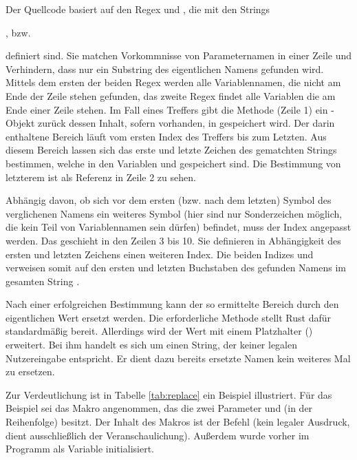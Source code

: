 Der Quellcode basiert auf den Regex  und , die mit den Strings 

, bzw. 

 definiert sind. Sie matchen Vorkommnisse von Parameternamen in einer Zeile und Verhindern, dass nur ein Substring des eigentlichen Namens gefunden wird. Mittels dem ersten der beiden Regex werden alle Variablennamen, die nicht am Ende der Zeile stehen gefunden, das zweite Regex findet alle Variablen die am Ende einer Zeile stehen. Im Fall eines Treffers gibt die Methode  (Zeile 1) ein -Objekt zurück dessen Inhalt, sofern vorhanden, in  gespeichert wird. Der darin enthaltene Bereich läuft vom ersten Index des Treffers bis zum Letzten. Aus diesem Bereich lassen sich das erste und letzte Zeichen des gematchten Strings bestimmen, welche in den Variablen  und  gespeichert sind. Die Bestimmung von letzterem ist als Referenz in Zeile 2 zu sehen.

Abhängig davon, ob sich vor dem ersten (bzw. nach dem letzten) Symbol des verglichenen Namens ein weiteres Symbol (hier sind nur Sonderzeichen möglich, die kein Teil von Variablennamen sein dürfen) befindet, muss der Index angepasst werden. Das geschieht in den Zeilen 3 bis 10. Sie definieren in Abhängigkeit des ersten und letzten Zeichens einen weiteren Index. Die beiden Indizes  und  verweisen somit auf den ersten und letzten Buchstaben des gefunden Namens im gesamten String .

Nach einer erfolgreichen Bestimmung kann der so ermittelte Bereich durch den eigentlichen Wert ersetzt werden. Die erforderliche Methode stellt Rust dafür standardmäßig bereit. Allerdings wird der Wert mit einem Platzhalter () erweitert. Bei ihm handelt es sich um einen String, der keiner legalen Nutzereingabe entspricht. Er dient dazu bereits ersetzte Namen kein weiteres Mal zu ersetzen.

Zur Verdeutlichung ist in Tabelle \ref{tab:replace} ein Beispiel illustriert. Für das Beispiel sei das Makro  angenommen, das die zwei Parameter  und  (in der Reihenfolge) besitzt. Der Inhalt des Makros ist der Befehl  (kein legaler Ausdruck, dient ausschließlich der Veranschaulichung). Außerdem wurde  vorher im Programm als Variable initialisiert.

